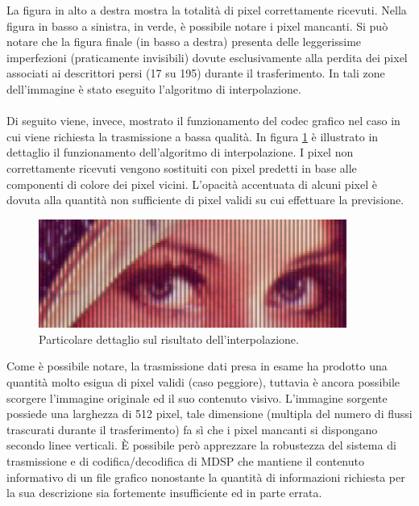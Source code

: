 La figura in alto a destra mostra la totalità di pixel correttamente
ricevuti. Nella figura in basso a sinistra, in verde, è possibile notare i pixel
mancanti. Si può notare che la figura finale (in basso a destra) presenta delle
leggerissime imperfezioni (praticamente invisibili) dovute esclusivamente alla
perdita dei pixel associati ai descrittori persi (17 su 195) durante il trasferimento. In tali zone dell'immagine è stato eseguito l'algoritmo di interpolazione.
\\\\
Di seguito viene, invece, mostrato il funzionamento del codec grafico
nel caso in cui viene richiesta la trasmissione a bassa qualità. In figura
\ref{fig:occhi} è illustrato in dettaglio il funzionamento dell'algoritmo di interpolazione. I pixel non correttamente
ricevuti vengono sostituiti con pixel predetti in base alle componenti di
colore dei pixel vicini. L'opacità accentuata di alcuni pixel è dovuta alla
quantità non sufficiente di pixel validi su cui effettuare la previsione.

\begin{figure}[ht]
\includegraphics[width=0.90\textwidth]{../images/occhi.png}
\centering \caption{Particolare dettaglio sul risultato dell'interpolazione.}
	\label{fig:occhi}
\end{figure}
Come è possibile notare, la trasmissione dati presa in esame ha prodotto una
quantità molto esigua di pixel validi (caso peggiore), tuttavia è ancora
possibile scorgere l'immagine originale ed il suo contenuto visivo. L'immagine sorgente possiede
una larghezza di 512 pixel, tale dimensione (multipla del numero di flussi
trascurati durante il trasferimento) fa sì che i pixel mancanti si dispongano
secondo linee verticali. \`E possibile però apprezzare la robustezza del
sistema di trasmissione e di codifica/decodifica di MDSP che mantiene il contenuto informativo di un file
grafico nonostante la quantità di informazioni richiesta per la sua descrizione
sia fortemente insufficiente ed in parte errata.
